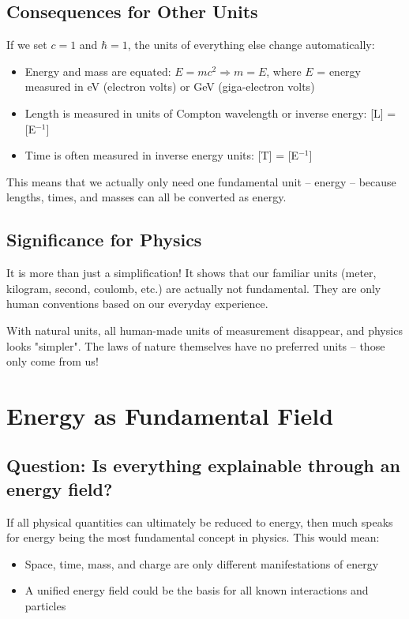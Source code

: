 \documentclass[12pt,a4paper]{article}
\begin{document}
	\subsection{Consequences for Other Units}
	If we set $c = 1$ and $\hbar = 1$, the units of everything else change automatically:
	
	\begin{itemize}
		\item Energy and mass are equated: $E = mc^2 \Rightarrow m = E$, where $E$ = energy measured in eV (electron volts) or GeV (giga-electron volts)
		\item Length is measured in units of Compton wavelength or inverse energy: [L] = [E$^{-1}$]
		\item Time is often measured in inverse energy units: [T] = [E$^{-1}$]
	\end{itemize}
	
	This means that we actually only need one fundamental unit – energy – because lengths, times, and masses can all be converted as energy.
	
	\subsection{Significance for Physics}
	It is more than just a simplification! It shows that our familiar units (meter, kilogram, second, coulomb, etc.) are actually not fundamental. They are only human conventions based on our everyday experience.
	
	With natural units, all human-made units of measurement disappear, and physics looks "simpler". The laws of nature themselves have no preferred units – those only come from us!
	
	\section{Energy as Fundamental Field}
	
	\subsection{Question: Is everything explainable through an energy field?}
	
	If all physical quantities can ultimately be reduced to energy, then much speaks for energy being the most fundamental concept in physics. This would mean:
	
	\begin{itemize}
		\item Space, time, mass, and charge are only different manifestations of energy
		\item A unified energy field could be the basis for all known interactions and particles
	\end{itemize}
	
\end{document}
